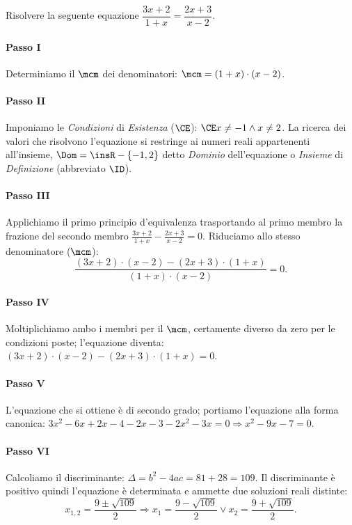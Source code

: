 \begin{exrig}
\begin{esempio}
Risolvere la seguente equazione $\dfrac{3 x + 2}{1 + x}=\dfrac{2 x + 3}{x - 2}$.
 \paragraph{Passo I} Determiniamo il $\mcm$ dei denominatori: $\mcm = ( 1 + x ) \cdot ( x - 2 )$.
 \paragraph{Passo II} Imponiamo le \emph{Condizioni} di \emph{Esistenza} ($\CE$): $\CE x \neq - 1 \wedge x \neq 2$. La ricerca dei valori che risolvono l'equazione si restringe ai numeri reali appartenenti all’insieme, $\Dom = \insR - \{- 1, 2 \}$ detto \emph{Dominio} dell’equazione o \emph{Insieme} di \emph{Definizione} (abbreviato $\ID$).
 \paragraph{Passo III} Applichiamo il primo principio d’equivalenza trasportando al primo membro la frazione del secondo membro $\frac{3 x + 2}{1 + x} - \frac{2 x + 3}{x - 2} = 0$. Riduciamo allo stesso denominatore ($\mcm$): 
\[\frac{( 3 x + 2 ) \cdot ( x - 2 ) - ( 2 x + 3 ) \cdot ( 1 + x )}{( 1 +x ) \cdot ( x - 2 )}=0.\]
 \paragraph{Passo IV} Moltiplichiamo ambo i membri per il $\mcm$, certamente diverso da zero per le condizioni poste; l’equazione diventa: $( 3 x + 2 ) \cdot ( x - 2 ) - ( 2 x + 3 ) \cdot ( 1 + x )=0$.
 \paragraph{Passo V} L’equazione che si ottiene è di secondo grado; portiamo l’equazione alla forma canonica: $3 x^{2} - 6 x + 2 x - 4 - 2 x - 3 - 2 x^{2} - 3 x=0 \Rightarrow x^{2} - 9 x - 7=0$.
 \paragraph{Passo VI} Calcoliamo il discriminante: $\Delta=b^{2} - 4 a c=81 + 28 = 109$. Il discriminante è positivo quindi l’equazione è determinata e ammette due soluzioni reali distinte: 
\[x_{1,2}=\frac{9 \pm \sqrt{109}}{2} \Rightarrow x_{1}=\frac{9 - \sqrt{109}}{2} \vee x_{2}=\frac{9 + \sqrt{109}}{2}.\]

\end{esempio}
\end{exrig}
